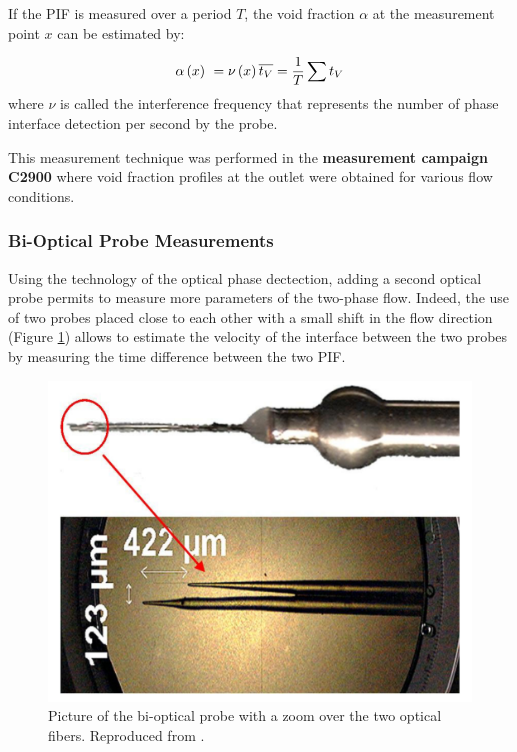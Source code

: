 If the PIF is measured over a period $T$, the void fraction $\alpha$ at the measurement point $x$ can be estimated by:


\begin{equation}
\alpha\left( x \right)\ = \nu\left( x \right) \overline{t_{V}} = \frac{1}{T} \sum t_{V}
\end{equation}
where $\nu$ is called the interference frequency that represents the number of phase interface detection per second by the probe.

\begin{note*}{}
This measurement technique was performed in the \textbf{measurement campaign C2900} where void fraction profiles at the outlet were obtained for various flow conditions.
\end{note*}

\subsubsection{Bi-Optical Probe Measurements}


Using the technology of the optical phase dectection, adding a second optical probe permits to measure more parameters of the two-phase flow. Indeed, the use of two probes placed close to each other with a small shift in the flow direction (Figure \ref{fig:optical_probe}) allows to estimate the velocity of the interface between the two probes by measuring the time difference between the two PIF.


\begin{figure}[!h]
\centering
\includegraphics[width=0.65\linewidth]{img/DEBORA/optical_probe.png}
\caption{Picture of the bi-optical probe with a zoom over the two optical fibers. Reproduced from \cite{gueguen_contribution_2013}.}
\label{fig:optical_probe}
\end{figure}

\npar

